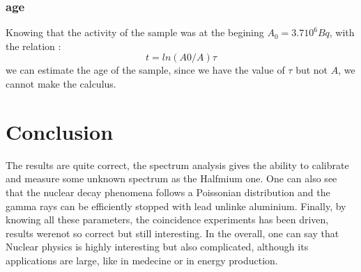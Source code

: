 \documentclass[a4paper,12pt,oneside]{article}
\def \be {\begin{equation}}
\def \ee {\end{equation}}
\begin{document}
\subsubsection{age}

	Knowing that the activity of the sample was at the begining $A_0 = 3.7 10^6 Bq$, with the relation :
	\be
		t=ln(A0/A)\tau
	\ee
	we can estimate the age of the sample, since we have the value of $\tau$ but not $A$, we cannot make the calculus. 










\section{Conclusion}
The results are quite correct, the spectrum analysis gives the ability to calibrate and measure some unknown spectrum as the Halfmium one. One can also see that the nuclear decay phenomena follows a Poissonian distribution and the gamma rays can be efficiently stopped with lead unlinke aluminium. Finally, by knowing all these parameters, the coincidence experiments has been driven, results werenot so correct but still interesting. In the overall, one can say that Nuclear physics is highly interesting but also complicated, although its applications are large, like in medecine or in energy production.




\begin{thebibliography}{99}
\end{thebibliography}
\end{document}
